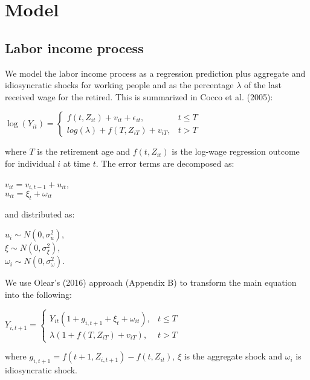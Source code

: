 \chapter{Model}
\label{model}

\section{Labor income process}

We model the labor income process as a regression prediction plus aggregate and idiosyncratic shocks for working people and as the percentage $\lambda$ of the last received wage for the retired. This is summarized in Cocco et al. (2005):

\begin{center}
	$\log(Y_{it}) =
		\begin{cases}
			f(t,Z_{it}) + v_{it} + \epsilon_{it}, & t \leq T \\
			log(\lambda) + f(T, Z_{iT}) + v_{iT}, & t > T
		\end{cases}
	$
\end{center}

where $T$ is the retirement age and $f(t, Z_{it})$ is the log-wage regression outcome for individual $i$ at time $t$. The error terms are decomposed as:

\begin{center}
	$v_{it} = v_{i,t-1} + u_{it}$,\\
	$u_{it} = \xi_t + \omega_{it}$
\end{center}

and distributed as:

\begin{center}
	$u_{i} \sim N(0, \sigma^2_u)$,\\
	$\xi \sim N(0,\sigma^2_{\xi})$,\\
	$\omega_{i} \sim N(0, \sigma^2_{\omega})$.
\end{center}

We use Olear's (2016) approach (Appendix B) to transform the main equation into the following:

\begin{center}
	$Y_{i,t+1} = 
	\begin{cases}
		Y_{it} (1 + g_{i,t+1} + \xi_t + \omega_{it}), & t \leq T \\
		\lambda (1 + f(T, Z_{iT}) + v_{iT}), & t > T
	\end{cases}	
	$
\end{center}

where $g_{i,t+1} = f(t+1, Z_{i,t+1}) - f(t, Z_{it})$, $\xi$ is the aggregate shock and $\omega_{i}$ is idiosyncratic shock.


